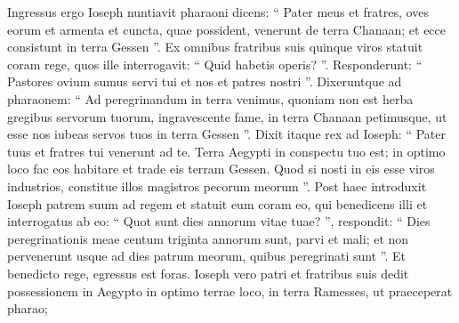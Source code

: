\begin{biblechapter}
\begin{biblechapter}
\begin{biblechapter}
\begin{biblechapter}
\begin{biblechapter}
\begin{biblechapter}
\begin{biblechapter}
\begin{biblechapter}
\begin{biblechapter}
\begin{biblechapter}
\begin{biblechapter}
\begin{biblechapter}
\begin{biblechapter}
\begin{biblechapter}
\begin{biblechapter}
\begin{biblechapter}
\begin{biblechapter}
\begin{biblechapter}
\begin{biblechapter}
\begin{biblechapter}
\begin{biblechapter}
\begin{biblechapter}
\begin{biblechapter}
\begin{biblechapter}
\begin{biblechapter}
\begin{biblechapter}
\begin{biblechapter}
\begin{biblechapter}
\begin{biblechapter}
\begin{biblechapter}
\begin{biblechapter}
\begin{biblechapter}
\begin{biblechapter}
\begin{biblechapter}
\begin{biblechapter}
\begin{biblechapter}
\begin{biblechapter}
\begin{biblechapter}
\begin{biblechapter}
\begin{biblechapter}
\begin{biblechapter}
\begin{biblechapter}
\begin{biblechapter}
\begin{biblechapter}
\begin{biblechapter}
\begin{biblechapter}
\begin{biblechapter}
\verse Ingressus ergo Ioseph nuntiavit pharaoni dicens: “ Pater meus et fratres, oves eorum et armenta et cuncta, quae possident, venerunt de terra Chanaan; et ecce consistunt in terra Gessen ”. 
\verse Ex omnibus fratribus suis quinque viros statuit coram rege, 
\verse quos ille interrogavit: “ Quid habetis operis? ”. Responderunt: “ Pastores ovium sumus servi tui et nos et patres nostri ”. 
\verse Dixeruntque ad pharaonem: “ Ad peregrinandum in terra venimus, quoniam non est herba gregibus servorum tuorum, ingravescente fame, in terra Chanaan petimusque, ut esse nos iubeas servos tuos in terra Gessen ”.
 \verse Dixit itaque rex ad Ioseph: “ Pater tuus et fratres tui venerunt ad te. 
\verse Terra Aegypti in conspectu tuo est; in optimo loco fac eos habitare et trade eis terram Gessen. Quod si nosti in eis esse viros industrios, constitue illos magistros pecorum meorum ”.
 \verse Post haec introduxit Ioseph patrem suum ad regem et statuit eum coram eo, qui benedicens illi 
\verse et interrogatus ab eo: “ Quot sunt dies annorum vitae tuae? ”, 
\verse respondit: “ Dies peregrinationis meae centum triginta annorum sunt, parvi et mali; et non pervenerunt usque ad dies patrum meorum, quibus peregrinati sunt ”. 
\verse Et benedicto rege, egressus est foras.
 \verse Ioseph vero patri et fratribus suis dedit possessionem in Aegypto in optimo terrae loco, in terra Ramesses, ut praeceperat pharao; 

\end{biblechapter}
\end{biblechapter}
\end{biblechapter}
\end{biblechapter}
\end{biblechapter}
\end{biblechapter}
\end{biblechapter}
\end{biblechapter}
\end{biblechapter}
\end{biblechapter}
\end{biblechapter}
\end{biblechapter}
\end{biblechapter}
\end{biblechapter}
\end{biblechapter}
\end{biblechapter}
\end{biblechapter}
\end{biblechapter}
\end{biblechapter}
\end{biblechapter}
\end{biblechapter}
\end{biblechapter}
\end{biblechapter}
\end{biblechapter}
\end{biblechapter}
\end{biblechapter}
\end{biblechapter}
\end{biblechapter}
\end{biblechapter}
\end{biblechapter}
\end{biblechapter}
\end{biblechapter}
\end{biblechapter}
\end{biblechapter}
\end{biblechapter}
\end{biblechapter}
\end{biblechapter}
\end{biblechapter}
\end{biblechapter}
\end{biblechapter}
\end{biblechapter}
\end{biblechapter}
\end{biblechapter}
\end{biblechapter}
\end{biblechapter}
\end{biblechapter}
\end{biblechapter}
